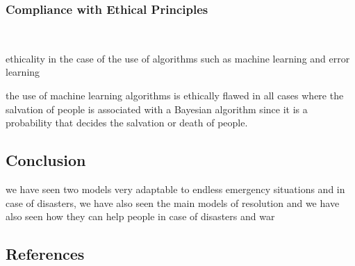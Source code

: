 \documentclass[letterpaper]{article} %
\begin{document}
    \subsubsection{Compliance with Ethical Principles}\label{compliance-with-ethical-principles}~\citet{basshuysen}

    ethicality in the case of the use of algorithms such as machine learning and error learning

    the use of machine learning algorithms is ethically flawed in all cases where the salvation of people is associated
    with a Bayesian algorithm since it is a probability that decides the salvation or death of people.


    \subsection{Conclusion}

    we have seen two models very adaptable to endless emergency situations and in case of disasters, we have also seen
    the main models of resolution and we have also seen how they can help people in case of disasters and war

    \subsection{References}

    
\end{document}
